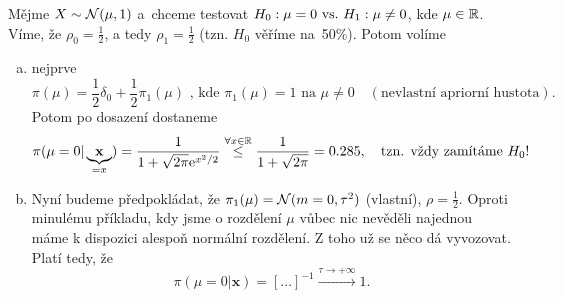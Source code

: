 \begin{example}
	Mějme $X\sim\mathcal{N}(\mu,1)$ a~chceme testovat $H_0: \mu=0 ~\text{vs.}~ H_1: \mu\neq0$, kde $\mu\in\mathbb{R}$. Víme, že $\rho_0=\frac{1}{2}$, a tedy $\rho_1=\frac{1}{2}$ (tzn. $H_0$ věříme na~50\%). Potom volíme
	\begin{enumerate}[a)]
		\item nejprve $$ \pi(\mu)=\frac{1}{2}\delta_0+\frac{1}{2}\pi_1(\mu)\text{ , kde }\pi_1(\mu)=1\text{ na~}\mu\neq0\quad(\text{nevlastní apriorní hustota}).$$
		Potom po dosazení dostaneme $$ \pi(\mu=0|\underbrace{\textbf{x}}_{=x})=\frac{1}{1+\sqrt{2\pi} \mathrm{e}^{x^2/2}}\stackrel{\forall x\in\mathbb{R}}{\leq}\frac{1}{1+\sqrt{2\pi}}=0.285,\quad \text{tzn. vždy zamítáme }H_0!$$
		\item Nyní budeme předpokládat, že $\pi_1(\mu)=\mathcal{N}(m=0,\tau^2)$ (vlastní), $\rho=\frac{1}{2}$. Oproti minulému příkladu, kdy jsme o rozdělení $\mu$ vůbec nic nevěděli najednou máme k dispozici alespoň normální rozdělení. Z toho už se něco dá vyvozovat. Platí tedy, že  $$\pi(\mu=0|\textbf{x})=[...]^{-1}\stackrel{\tau\to+\infty}{\longrightarrow}1.$$
	\end{enumerate}
\end{example}
